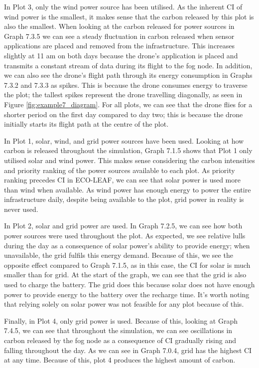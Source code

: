 \documentclass{l4proj}
\begin{document}
In Plot 3, only the wind power source has been utilised.
As the inherent CI of wind power is the smallest, it makes sense that the carbon released by this plot is also the smallest.
When looking at the carbon released for power sources in Graph 7.3.5 we can see a steady fluctuation in carbon released when sensor applications are placed and removed from the infrastructure.
This increases slightly at 11 am on both days because the drone's application is placed and transmits a constant stream of data during its flight to the fog node.
In addition, we can also see the drone's flight path through its energy consumption in Graphs 7.3.2 and 7.3.3 as spikes.
This is because the drone consumes energy to traverse the plot; the tallest spikes represent the drone travelling diagonally, as seen in Figure \ref{fig:example7_diagram}.
For all plots, we can see that the drone flies for a shorter period on the first day compared to day two; this is because the drone initially starts its flight path at the centre of the plot.

In Plot 1, solar, wind, and grid power sources have been used.
Looking at how carbon is released throughout the simulation, Graph 7.1.5 shows that Plot 1 only utilised solar and wind power.
This makes sense considering the carbon intensities and priority ranking of the power sources available to each plot.
As priority ranking precedes CI in ECO-LEAF, we can see that solar power is used more than wind when available.
As wind power has enough energy to power the entire infrastructure daily, despite being available to the plot, grid power in reality is never used.

In Plot 2, solar and grid power are used.
In Graph 7.2.5, we can see how both power sources were used throughout the plot.
As expected, we see relative lulls during the day as a consequence of solar power's ability to provide energy; when unavailable, the grid fulfils this energy demand.
Because of this, we see the opposite effect compared to Graph 7.1.5, as in this case, the CI for solar is much smaller than for grid.
At the start of the graph, we can see that the grid is also used to charge the battery.
The grid does this because solar does not have enough power to provide energy to the battery over the recharge time.
It's worth noting that relying solely on solar power was not feasible for any plot because of this.

Finally, in Plot 4, only grid power is used.
Because of this, looking at Graph 7.4.5, we can see that throughout the simulation, we can see oscillations in carbon released by the fog node as a consequence of CI gradually rising and falling throughout the day.
As we can see in Graph 7.0.4, grid has the highest CI at any time. Because of this, plot 4 produces the highest amount of carbon.
\end{document}
